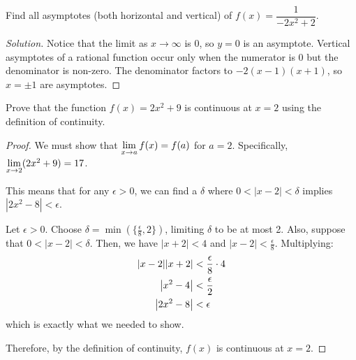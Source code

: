 \documentclass{agony}
\begin{document}
\question Find all asymptotes (both horizontal and vertical) of $f(x) = \dfrac{1}{-2x^2+2}$.
\begin{proof}[Solution]
  Notice that the limit as $x \to \infty$ is 0, so $y=0$ is an asymptote.
  Vertical asymptotes of a rational function occur only when the numerator is 0 but the denominator is non-zero.
  The denominator factors to $-2(x-1)(x+1)$, so $x=\pm 1$ are asymptotes.
\end{proof}

\question Prove that the function $f(x)=2x^2+9$ is continuous at $x=2$ using the \epsdel{} definition of continuity.
\begin{proof}
  We must show that $\lim\limits_{x\to a}f(x) = f(a)$ for $a=2$.
  Specifically, $\lim\limits_{x\to2} (2x^2+9) = 17$.

  This means that for any $\epsilon > 0$, we can find a $\delta$ where $0 < |x-2| < \delta$
  implies $|2x^2-8| < \epsilon$.

  Let $\epsilon > 0$.
  Choose $\delta = \min(\{\frac{\epsilon}{8},2\})$, limiting $\delta$ to be at most 2.
  Also, suppose that $0 < |x-2| < \delta$.
  Then, we have $|x+2| < 4$ and $|x-2| < \frac{\epsilon}{8}$.
  Multiplying:
  \begin{align*}
    \abs{x-2}\abs{x+2} & < \frac{\epsilon}{8} \cdot 4 \\
    \abs{x^2-4}        & < \frac{\epsilon}{2}         \\
    \abs{2x^2-8}       & < \epsilon
  \end{align*}
  which is exactly what we needed to show.

  Therefore, by the \epsdel{} definition of continuity, $f(x)$ is continuous at $x=2$.
\end{proof}
\end{document}
